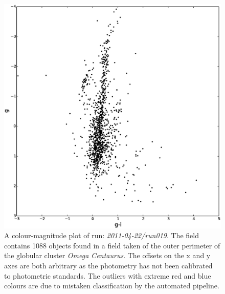 \begin{figure}
\centering
\includegraphics[width=120mm]{images//2011-04-22-run019-omegacen-colourmagnitude.eps}
\caption{A colour-magnitude plot of run: \emph{2011-04-22/run019}. The field contains 1088 objects found in a field taken of the outer perimeter of the globular cluster \emph{Omega Centaurus}. The offsets on the x and y axes are both arbitrary as the photometry has not been calibrated to photometric standards. The outliers with extreme red and blue colours are due to mistaken classification by the automated pipeline.}
\label{fig:OmegaCen-colourmagnitude}
\end{figure}

